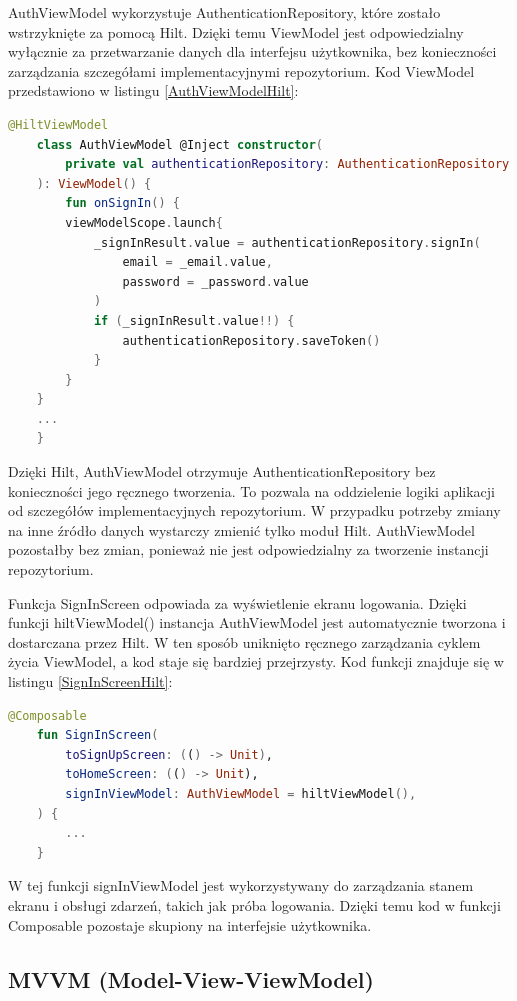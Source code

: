 \documentclass[12pt,twoside]{article}
\begin{document}
AuthViewModel wykorzystuje AuthenticationRepository, które zostało wstrzyknięte za pomocą Hilt. Dzięki temu ViewModel 
jest odpowiedzialny wyłącznie za przetwarzanie danych dla interfejsu użytkownika, bez konieczności zarządzania 
szczegółami implementacyjnymi repozytorium. Kod ViewModel przedstawiono w listingu \ref{AuthViewModelHilt}:
\begin{lstlisting}[language=Kotlin,caption=Implementacja AuthViewModel, label={AuthViewModelHilt}]
	@HiltViewModel
	class AuthViewModel @Inject constructor(
		private val authenticationRepository: AuthenticationRepository
	): ViewModel() {
		fun onSignIn() {
        viewModelScope.launch{
            _signInResult.value = authenticationRepository.signIn(
                email = _email.value,
                password = _password.value
            )
            if (_signInResult.value!!) {
                authenticationRepository.saveToken()
            }
        }
    }
	... 
	}
\end{lstlisting}
Dzięki Hilt, AuthViewModel otrzymuje AuthenticationRepository bez konieczności jego ręcznego tworzenia. To pozwala 
na oddzielenie logiki aplikacji od szczegółów implementacyjnych repozytorium. W przypadku potrzeby zmiany na inne
źródło danych wystarczy zmienić tylko moduł Hilt. AuthViewModel pozostałby bez zmian, ponieważ nie jest odpowiedzialny 
za tworzenie instancji repozytorium.

Funkcja SignInScreen odpowiada za wyświetlenie ekranu logowania. Dzięki funkcji hiltViewModel() instancja 
AuthViewModel jest automatycznie tworzona i dostarczana przez Hilt. W ten sposób uniknięto ręcznego zarządzania 
cyklem życia ViewModel, a kod staje się bardziej przejrzysty. Kod funkcji znajduje się w listingu \ref{SignInScreenHilt}:
\begin{lstlisting}[language=Kotlin,caption=Implementacja AuthViewModel, label={SignInScreenHilt}]
	@Composable
	fun SignInScreen(
		toSignUpScreen: (() -> Unit),
		toHomeScreen: (() -> Unit),
		signInViewModel: AuthViewModel = hiltViewModel(),
	) {
		...
	}
\end{lstlisting}
W tej funkcji signInViewModel jest wykorzystywany do zarządzania stanem ekranu i obsługi zdarzeń, takich jak próba 
logowania. Dzięki temu kod w funkcji Composable pozostaje skupiony na interfejsie użytkownika.

\subsection{MVVM (Model-View-ViewModel)}
\end{document}
